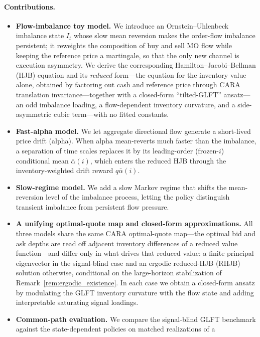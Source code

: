 \documentclass[11pt,a4paper]{article}
\newcommand{\alphabar}{\bar\alpha}
\theoremstyle{plain}
\theoremstyle{definition}
\begin{document}
\paragraph{Contributions.}
\begin{itemize}[leftmargin=1.2em,itemsep=1pt,topsep=2pt]
\item \textbf{Flow-imbalance toy model.}  We introduce an Ornstein--Uhlenbeck
  imbalance state \(I_t\) whose slow mean reversion makes the order-flow
  imbalance persistent; it reweights the composition of buy and sell MO flow while
  keeping the reference price a martingale, so that the only new channel is
  execution asymmetry.  We derive the corresponding Hamilton--Jacobi--Bellman
  (HJB) equation and its \emph{reduced} form---the equation for the inventory
  value alone, obtained by factoring out cash and reference price through CARA
  translation invariance---together with a closed-form ``tilted-GLFT'' ansatz---an odd imbalance
  loading, a flow-dependent inventory curvature, and a side-asymmetric cubic
  term---with no fitted constants.
\item \textbf{Fast-alpha model.}  We let aggregate directional flow generate
  a short-lived price drift (alpha).  When alpha mean-reverts much faster
  than the imbalance, a separation of time scales replaces it by its
  leading-order (frozen-\(i\)) conditional mean \(\alphabar(i)\), which enters
  the reduced HJB through the inventory-weighted drift reward
  \(q\alphabar(i)\).
\item \textbf{Slow-regime model.}  We add a slow Markov regime that shifts
  the mean-reversion level of the imbalance process, letting the policy
  distinguish transient imbalance from persistent flow pressure.
\item \textbf{A unifying optimal-quote map and closed-form approximations.}  All three
  models share the same CARA optimal-quote map---the optimal bid and ask
  depths are read off adjacent inventory differences of a reduced value
  function---and differ only in what drives that reduced value: a finite
  principal eigenvector in the signal-blind case and an ergodic reduced-HJB
  (RHJB) solution otherwise, conditional on the large-horizon stabilization
  of Remark~\ref{rem:ergodic_existence}.  In each case we obtain a closed-form ansatz by
  modulating the GLFT inventory curvature with the flow state and adding
  interpretable saturating signal loadings.
\item \textbf{Common-path evaluation.}  We compare the signal-blind GLFT
  benchmark against the state-dependent policies on matched realizations of a

\end{itemize}
\end{document}
